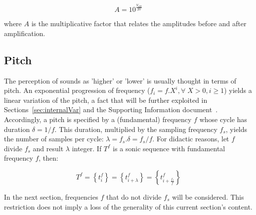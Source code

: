 \begin{equation}\label{ampDec}
A = 10^{\frac{V_{dB}}{20}}
\end{equation}

\noindent where $A$ is the multiplicative factor that relates the amplitudes before and after amplification.

\subsection{Pitch}
The perception of sounds as 'higher' or 'lower' is usually thought in terms of pitch.
An exponential progression of frequency ($f_i = f . X^i, \forall \;X > 0, i \geq 1$) yields a linear variation of the pitch,
a fact that will be further exploited in Sections~\ref{sec:internalVar} and the Supporting Information document~\cite{massNotesInMusic}.
Accordingly, a pitch is specified by a (fundamental) frequency $f$ whose cycle has duration $\delta=1/f$.
This duration, multiplied by the sampling frequency $f_s$, yields the number of samples per cycle:
$\lambda=f_s . \delta =f_s/f$.
For didactic reasons, let $f$ divide $f_s$ and result $\lambda$ integer.
If $T^f$ is a sonic sequence with fundamental frequency $f$, then:

\begin{equation}\label{periodicidade}
     T^f=\left\{ t_i^f \right\}=\left\{ t^f_{i+\lambda}  \right\}= \left\{ t^f_{i+\frac{f_s}{f}} \right\}
\end{equation}

In the next section, frequencies $f$ that do not divide $f_s$ will be considered. This restriction does not imply a loss of the generality of this current section's content.

